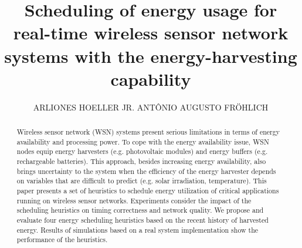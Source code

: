 \documentclass[prodmode,acmtecs]{acmsmall}
\begin{document}

\title{Scheduling of energy usage for real-time wireless sensor network systems with the energy-harvesting capability}
\author{ARLIONES HOELLER JR.
ANT{\^O}NIO AUGUSTO FR{\"O}HLICH
}


\begin{abstract}
Wireless sensor network (WSN) systems present serious limitations in terms of energy availability and processing power.
To cope with the energy availability issue, WSN nodes equip energy harvesters (e.g. photovoltaic modules) and energy buffers (e.g. rechargeable batteries).
This approach, besides increasing energy availability, also brings uncertainty to the system when the efficiency of the energy harvester depends on variables that are difficult to predict (e.g. solar irradiation, temperature).
This paper presents a set of heuristics to schedule energy utilization of critical applications running on wireless sensor networks.
Experiments consider the impact of the scheduling heuristics on timing correctness and network quality.
We propose and evaluate four energy scheduling heuristics based on the recent history of harvested energy.
Results of simulations based on a real system implementation show the performance of the heuristics.%
%
\end{abstract}

\end{document}
